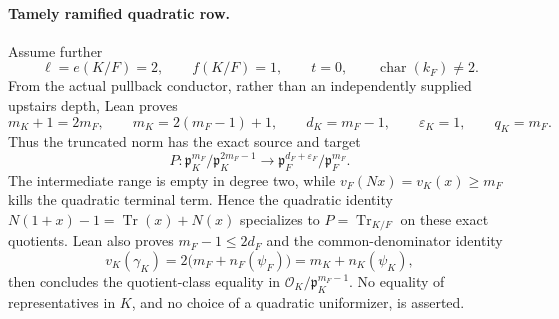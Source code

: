 \begin{theorem}
\paragraph{Tamely ramified quadratic row.}
Assume further
\[
 \ell=e(K/F)=2,\qquad f(K/F)=1,\qquad t=0,\qquad
 \operatorname{char}(k_F)\ne2.
\]
From the actual pullback conductor, rather than an independently supplied
upstairs depth, Lean proves
\[
 m_K+1=2m_F,\qquad
 m_K=2(m_F-1)+1,\qquad
 d_K=m_F-1,\qquad \varepsilon_K=1,\qquad q_K=m_F.
\]
Thus the truncated norm has the exact source and target
\[
 P:\mathfrak p_K^{m_F}/\mathfrak p_K^{2m_F-1}
   \longrightarrow
   \mathfrak p_F^{d_F+\varepsilon_F}/\mathfrak p_F^{m_F}.
\]
The intermediate range is empty in degree two, while
$v_F(Nx)=v_K(x)\geq m_F$ kills the quadratic terminal term.  Hence the
quadratic identity $N(1+x)-1=\operatorname{Tr}(x)+N(x)$ specializes to
$P=\operatorname{Tr}_{K/F}$ on these exact quotients.  Lean also proves
$m_F-1\leq2d_F$ and the common-denominator identity
\[
 v_K(\gamma_K)=2\bigl(m_F+n_F(\psi_F)\bigr)
               =m_K+n_K(\psi_K),
\]
then concludes the quotient-class equality in
$\mathcal O_K/\mathfrak p_K^{m_F-1}$.  No equality of representatives in
$K$, and no choice of a quadratic uniformizer, is asserted.


\end{theorem}
